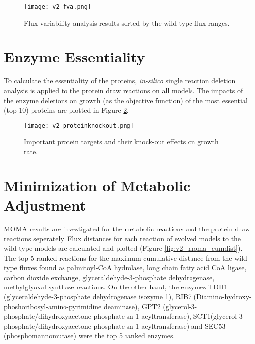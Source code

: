 \begin{figure}[H]
\begin{center}
\texttt{[image: v2\_fva.png]}
\caption[Flux variability analysis]{Flux variability analysis results sorted by the wild-type flux ranges.}
\end{center}
\label{fig:v2_fva}
\end{figure}



\section{Enzyme Essentiality}
To calculate the essentiality of the proteins, \emph{in-silico} single reaction deletion analysis is applied to the protein draw reactions on all models. The impacts of the enzyme deletions on growth (as the objective function) of the most essential (top 10) proteins are plotted in Figure \ref{fig:v2_proteinknockout}.

\begin{figure}[H]
\begin{center}
\texttt{[image: v2\_proteinknockout.png]}
\end{center}
\caption[Important protein targets and their knock-out effects on growth rate]{Important protein targets and their knock-out effects on growth rate.}
\label{fig:v2_proteinknockout}
\end{figure}


\section{Minimization of Metabolic Adjustment}

MOMA results are investigated for the metabolic reactions and the protein draw reactions seperately. Flux distances for each reaction of evolved models to the wild type models are calculated and plotted (Figure \ref{fig:v2_moma_cumdist}). The top 5 ranked reactions for the maximum cumulative distance from the wild type fluxes found as palmitoyl-CoA hydrolase, long chain fatty acid CoA ligase, carbon dioxide exchange, glyceraldehyde-3-phosphate dehydrogenase, methylglyoxal synthase reactions. On the other hand, the enzymes TDH1 (glyceraldehyde-3-phosphate dehydrogenase isozyme 1), RIB7 (Diamino-hydroxy-phoshoribosyl-amino-pyrimidine deaminase), GPT2 (glycerol-3-phosphate/dihydroxyacetone phosphate sn-1 acyltransferase), SCT1(glycerol 3-phosphate/dihydroxyacetone phosphate sn-1 acyltransferase) and SEC53 (phosphomannomutase) were the top 5 ranked enzymes.

